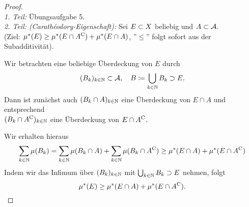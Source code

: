 \documentclass[skript.tex]{subfiles}
\begin{document}
		\begin{proof}
			\hfill\\ %
			\emph{1. Teil:} Übungsaufgabe 5. \\
			\emph{2. Teil: (Carathéodory-Eigenschaft):}\quad
			Sei $E \subset X$ beliebig und $A \subset \mathcal{A}$. \\
			(Ziel: $\mu^*(E) \geq \mu^*(E \cap A^\mathrm{C}) + \mu^*(E \cap A)$, ''$\leq$'' folgt sofort aus der Subadditivität).
			
			Wir betrachten eine beliebige Überdeckung von $E$ durch
			\[
				(B_k)_{k\in\mathbb{N}} \subset \mathcal{A},\quad B \coloneqq \bigcup_{k\in\mathbb{N}} B_k \supset E.
			\]
			Dann ist zunächst auch $(B_k \cap A)_{k\in\mathbb{N}}$ eine Überdeckung von $E \cap A$
			und entsprechend \\ $(B_k \cap A^\mathrm{C})_{k\in\mathbb{N}}$ eine Überdeckung von $E \cap A^\mathrm{C}$.
			
			Wir erhalten hieraus
			\[
				\sum_{k\in\mathbb{N}} \mu(B_k) = \sum_{k\in\mathbb{N}} \mu(B_k \cap A) 
									+ \sum_{k\in\mathbb{N}} \mu(B_k \cap A^\mathrm{C})
					\geq \mu^*(E \cap A) + \mu^*(E \cap A^\mathrm{C})
			\]
			Indem wir das Infimum über $(B_k)_{k\in\mathbb{N}}$ mit $\bigcup_{k\in\mathbb{N}} B_k \supset E$ nehmen,
			folgt 
			\[
				\mu^*(E) \geq \mu^*(E \cap A) + \mu^*(E \cap A^\mathrm{C}).
			\]
		\end{proof}
		
\end{document}
